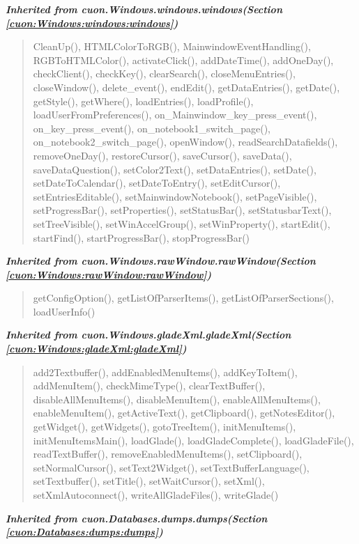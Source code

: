 \large{\textbf{\textit{Inherited from cuon.Windows.windows.windows\textit{(Section \ref{cuon:Windows:windows:windows})}}}}

\begin{quote}
CleanUp(), HTMLColorToRGB(), MainwindowEventHandling(), RGBToHTMLColor(), activateClick(), addDateTime(), addOneDay(), checkClient(), checkKey(), clearSearch(), closeMenuEntries(), closeWindow(), delete\_event(), endEdit(), getDataEntries(), getDate(), getStyle(), getWhere(), loadEntries(), loadProfile(), loadUserFromPreferences(), on\_Mainwindow\_key\_press\_event(), on\_key\_press\_event(), on\_notebook1\_switch\_page(), on\_notebook2\_switch\_page(), openWindow(), readSearchDatafields(), removeOneDay(), restoreCursor(), saveCursor(), saveData(), saveDataQuestion(), setColor2Text(), setDataEntries(), setDate(), setDateToCalendar(), setDateToEntry(), setEditCursor(), setEntriesEditable(), setMainwindowNotebook(), setPageVisible(), setProgressBar(), setProperties(), setStatusBar(), setStatusbarText(), setTreeVisible(), setWinAccelGroup(), setWinProperty(), startEdit(), startFind(), startProgressBar(), stopProgressBar()
\end{quote}

\large{\textbf{\textit{Inherited from cuon.Windows.rawWindow.rawWindow\textit{(Section \ref{cuon:Windows:rawWindow:rawWindow})}}}}

\begin{quote}
getConfigOption(), getListOfParserItems(), getListOfParserSections(), loadUserInfo()
\end{quote}

\large{\textbf{\textit{Inherited from cuon.Windows.gladeXml.gladeXml\textit{(Section \ref{cuon:Windows:gladeXml:gladeXml})}}}}

\begin{quote}
add2Textbuffer(), addEnabledMenuItems(), addKeyToItem(), addMenuItem(), checkMimeType(), clearTextBuffer(), disableAllMenuItems(), disableMenuItem(), enableAllMenuItems(), enableMenuItem(), getActiveText(), getClipboard(), getNotesEditor(), getWidget(), getWidgets(), gotoTreeItem(), initMenuItems(), initMenuItemsMain(), loadGlade(), loadGladeComplete(), loadGladeFile(), readTextBuffer(), removeEnabledMenuItems(), setClipboard(), setNormalCursor(), setText2Widget(), setTextBufferLanguage(), setTextbuffer(), setTitle(), setWaitCursor(), setXml(), setXmlAutoconnect(), writeAllGladeFiles(), writeGlade()
\end{quote}

\large{\textbf{\textit{Inherited from cuon.Databases.dumps.dumps\textit{(Section \ref{cuon:Databases:dumps:dumps})}}}}


